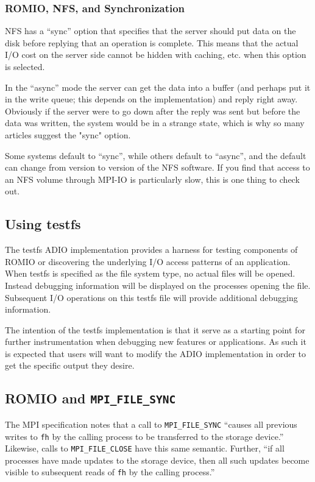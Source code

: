 \subsubsection{ROMIO, NFS, and Synchronization}

NFS has a ``sync'' option that specifies that the server should put data on
the disk before replying that an operation is complete.  This means that
the actual I/O cost on the server side cannot be hidden with caching,
etc. when this option is selected.
                                                                                
In the ``async'' mode the server can get the data into a buffer (and
perhaps put it in the write queue; this depends on the implementation)
and reply right away.  Obviously if the server were to go down after the
reply was sent but before the data was written, the system would be in
a strange state, which is why so many articles suggest the "sync" option.

Some systems default to ``sync'', while others default to ``async'',
and the default can change from version to version of the NFS software.  If
you find that access to an NFS volume through MPI-IO is particularly slow,
this is one thing to check out.


\subsection{Using testfs}
The testfs ADIO implementation provides a harness for testing components
of ROMIO or discovering the underlying I/O access patterns of an
application.  When testfs is specified as the file system type, no
actual files will be opened.  Instead debugging information will be
displayed on the processes opening the file.  Subsequent I/O operations
on this testfs file will provide additional debugging information.

The intention of the testfs implementation is that it serve as a
starting point for further instrumentation when debugging new features
or applications.  As such it is expected that users will want to modify
the ADIO implementation in order to get the specific output they desire.

\subsection{ROMIO and {\tt MPI\_FILE\_SYNC}}

The MPI specification notes that a call to {\tt MPI\_FILE\_SYNC} ``causes
all previous writes to {\tt fh} by the calling process to be transferred to
the storage device.''  Likewise, calls to {\tt MPI\_FILE\_CLOSE} have this
same semantic.  Further, ``if all processes have made updates to the storage
device, then all such updates become visible to subsequent reads of {\tt fh}
by the calling process.''

